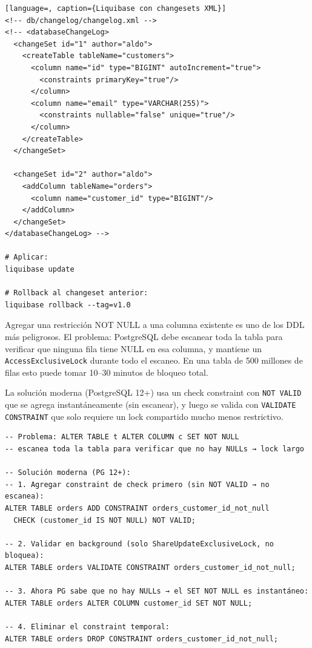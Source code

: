 \begin{lstlisting}[language=, caption={Liquibase con changesets XML}]
<!-- db/changelog/changelog.xml -->
<!-- <databaseChangeLog>
  <changeSet id="1" author="aldo">
    <createTable tableName="customers">
      <column name="id" type="BIGINT" autoIncrement="true">
        <constraints primaryKey="true"/>
      </column>
      <column name="email" type="VARCHAR(255)">
        <constraints nullable="false" unique="true"/>
      </column>
    </createTable>
  </changeSet>

  <changeSet id="2" author="aldo">
    <addColumn tableName="orders">
      <column name="customer_id" type="BIGINT"/>
    </addColumn>
  </changeSet>
</databaseChangeLog> -->

# Aplicar:
liquibase update

# Rollback al changeset anterior:
liquibase rollback --tag=v1.0
\end{lstlisting}

Agregar una restricción NOT NULL a una columna existente es uno de los DDL más peligrosos.
El problema: PostgreSQL debe escanear toda la tabla para verificar que ninguna fila tiene NULL en esa columna, y mantiene un \texttt{AccessExclusiveLock} durante todo el escaneo.
En una tabla de 500 millones de filas esto puede tomar 10--30 minutos de bloqueo total.

La solución moderna (PostgreSQL 12+) usa un check constraint con \texttt{NOT VALID} que se agrega instantáneamente (sin escanear), y luego se valida con \texttt{VALIDATE CONSTRAINT} que solo requiere un lock compartido mucho menos restrictivo.

\begin{lstlisting}[caption={Agregar NOT NULL sin downtime}]
-- Problema: ALTER TABLE t ALTER COLUMN c SET NOT NULL
-- escanea toda la tabla para verificar que no hay NULLs → lock largo

-- Solución moderna (PG 12+):
-- 1. Agregar constraint de check primero (sin NOT VALID → no escanea):
ALTER TABLE orders ADD CONSTRAINT orders_customer_id_not_null
  CHECK (customer_id IS NOT NULL) NOT VALID;

-- 2. Validar en background (solo ShareUpdateExclusiveLock, no bloquea):
ALTER TABLE orders VALIDATE CONSTRAINT orders_customer_id_not_null;

-- 3. Ahora PG sabe que no hay NULLs → el SET NOT NULL es instantáneo:
ALTER TABLE orders ALTER COLUMN customer_id SET NOT NULL;

-- 4. Eliminar el constraint temporal:
ALTER TABLE orders DROP CONSTRAINT orders_customer_id_not_null;
\end{lstlisting}

